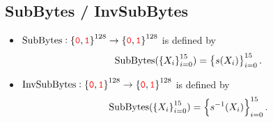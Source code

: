 \subsection{SubBytes / InvSubBytes}
\begin{itemize}
	\item $\text{SubBytes}:\set{\textcolor{red}{\texttt{0}},\textcolor{red}{\texttt{1}}}^{128}\to\set{\textcolor{red}{\texttt{0}},\textcolor{red}{\texttt{1}}}^{128}$ is defined by \[
	\text{SubBytes}(\set{X_i}_{i=0}^{15})=\set{s(X_i)}_{i=0}^{15}.
	\]
	\item $\text{InvSubBytes}:\set{\textcolor{red}{\texttt{0}},\textcolor{red}{\texttt{1}}}^{128}\to\set{\textcolor{red}{\texttt{0}},\textcolor{red}{\texttt{1}}}^{128}$ is defined by \[
	\text{SubBytes}(\set{X_i}_{i=0}^{15})=\set{s^{-1}(X_i)}_{i=0}^{15}.
	\]
\end{itemize}

\newcommand{\headerrow}{%
	& 00 & 01 & 02 & 03 & 04 & 05 & 06 & 07 & 08 & 09 & 0a & 0b & 0c & 0d & 0e & 0f \\
}

